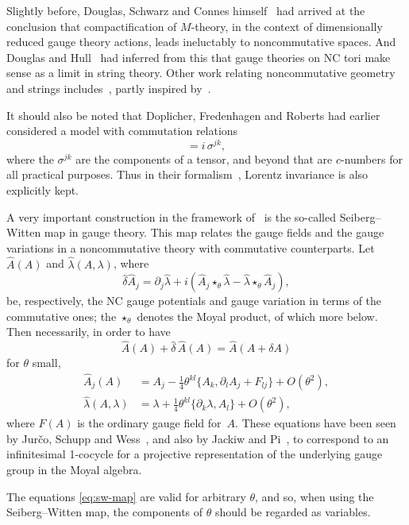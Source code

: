 \documentclass[a4paper,12pt]{article}
\newcommand{\Ahat}{\Hat{A}}
\newcommand{\del}{\partial}         %
\renewcommand{\Hat}[1]{\widehat{#1}}  %
\newcommand{\la}{\lambda}           %
\newcommand{\lahat}{\hat\la}        %
\newcommand{\tquarter}{\tfrac{1}{4}}  %
\newcommand{\1}{\mathbf{1}}         %
\newcommand{\7}{\dagger}            %
\newcommand{\8}{\bullet}            %
\renewcommand{\.}{\cdot}            %
\renewcommand{\:}{\colon}           %
\begin{document}
Slightly before, Douglas, Schwarz and Connes himself~\cite{ConnesDS}
had arrived at the conclusion that compactification of $M$-theory, in
the context of dimensionally reduced gauge theory actions, leads
ineluctably to noncommutative spaces. And Douglas and Hull~\cite{DouglasH}
had inferred from this that gauge theories on NC tori make sense as a 
limit in string theory. Other work relating noncommutative geometry and
strings includes~\cite{LandiLS}, partly inspired by~\cite{FroehlichG}.

It should also be noted that
Doplicher, Fredenhagen and Roberts had earlier considered a model
with commutation relations
\begin{equation}
[x^j, x^k] = i\, \sigma^{jk},
\label{eq:DFRcomm-reln}
\end{equation}
where the $\sigma^{jk}$ are the components of a tensor, and beyond
that are $c$-numbers for all practical purposes. Thus in their
formalism~\cite{DoplicherFR}, Lorentz invariance is also explicitly
kept.

A very important construction in the framework of~\cite{SeibergW} is
the so-called Seiberg--Witten map in gauge theory. This map relates
the gauge fields and the gauge variations in a noncommutative theory
with commutative counterparts. Let $\Ahat(A)$ and $\lahat(A,\la)$,
where
$$
\hat\delta \Ahat_j
= \del_j \lahat + i (\Ahat_j \star_\theta \lahat - \lahat
\star_\theta \Ahat_j),
$$
be, respectively, the NC gauge potentials and gauge variation in terms
of the commutative ones; the $\star_\theta$ denotes the Moyal product,
of which more below. Then necessarily, in order to have
$$
\Ahat(A) + \hat\delta\,\Ahat(A) = \Ahat(A + \delta A)
$$
for $\theta$ small,
\begin{align}
\Ahat_j(A) 
&= A_j - \tquarter \theta^{kl} \{A_k, \del_l A_j + F_{lj} \}
   + O(\theta^2),
\nonumber \\
\lahat(A,\la)
&= \la + \tquarter \theta^{kl} \{\del_k \la, A_l \} + O(\theta^2),
\label{eq:sw-map}
\end{align}
where $F(A)$ is the ordinary gauge field for~$A$. These equations have
been seen by Jur\v{c}o, Schupp and Wess~\cite{JurcoSW}, and also by
Jackiw and Pi~\cite{JackiwP}, to correspond to an infinitesimal
1-cocycle for a projective representation of the underlying gauge
group in the Moyal algebra.

The equations \eqref{eq:sw-map} are valid for arbitrary $\theta$, and 
so, when using the Seiberg--Witten map, the components of $\theta$ 
should be regarded as variables. 
\end{document}
